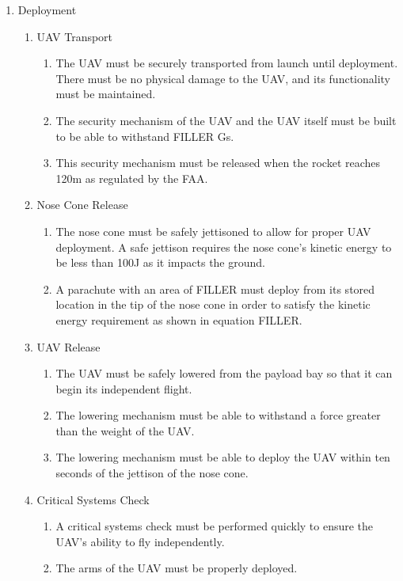 \begin{enumerate}[noitemsep, label=\arabic*.]
	\item Deployment
	\begin{enumerate}[noitemsep, label=1.\arabic*.]
		\item UAV Transport 
		\begin{enumerate}[noitemsep, label=1.1.\arabic*.]
			\item The UAV must be securely transported from launch until deployment. There must be no physical damage to the UAV, and its functionality must be maintained.
			\item The security mechanism of the UAV and the UAV itself must be built to be able to withstand FILLER Gs. 
			\item This security mechanism must be released when the rocket reaches 120m as regulated by the FAA. 
		\end{enumerate}
		\item Nose Cone Release
		\begin{enumerate}[noitemsep, label=1.2.\arabic*.]
			\item The nose cone must be safely jettisoned to allow for proper UAV deployment. A safe jettison requires the nose cone's kinetic energy to be less than 100J as it impacts the ground.
			\item A parachute with an area of FILLER must deploy from its stored location in the tip of the nose cone in order to satisfy the kinetic energy requirement as shown in equation FILLER.
		\end{enumerate}
		\item UAV Release
		\begin{enumerate}[noitemsep, label=1.3.\arabic*.]
			\item The UAV must be safely lowered from the payload bay so that it can begin its independent flight.
			\item The lowering mechanism must be able to withstand a force greater than the weight of the UAV.
			\item The lowering mechanism must be able to deploy the UAV within ten seconds of the jettison of the nose cone.
		\end{enumerate}
		\item Critical Systems Check
		\begin{enumerate}[noitemsep, label=1.4.\arabic*.]
			\item A critical systems check must be performed quickly to ensure the UAV's ability to fly independently.
			\item The arms of the UAV must be properly deployed.

\end{enumerate}
\end{enumerate}
\end{enumerate}
